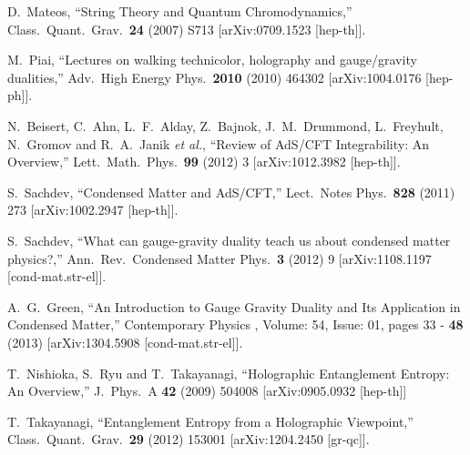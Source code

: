 \documentclass[12pt,notitlepage,a4paper]{article}
\begin{document}
\begin{thebibliography}{99.}
 


  D.~Mateos,
  ``String Theory and Quantum Chromodynamics,''
  Class.\ Quant.\ Grav.\  {\bf 24} (2007) S713
  [arXiv:0709.1523 [hep-th]].

 
 
 
 
  M.~Piai,
  ``Lectures on walking technicolor, holography and gauge/gravity dualities,''
  Adv.\ High Energy Phys.\  {\bf 2010} (2010) 464302
  [arXiv:1004.0176 [hep-ph]].

 
 
  N.~Beisert, C.~Ahn, L.~F.~Alday, Z.~Bajnok, J.~M.~Drummond, L.~Freyhult, N.~Gromov and R.~A.~Janik {\it et al.},
  ``Review of AdS/CFT Integrability: An Overview,''
  Lett.\ Math.\ Phys.\  {\bf 99} (2012) 3
  [arXiv:1012.3982 [hep-th]].
 
 
 
 
  S.~Sachdev,
 ``Condensed Matter and AdS/CFT,''
  Lect.\ Notes Phys.\  {\bf 828} (2011) 273
  [arXiv:1002.2947 [hep-th]].


  S.~Sachdev,
  ``What can gauge-gravity duality teach us about condensed matter physics?,''
  Ann.\ Rev.\ Condensed Matter Phys.\  {\bf 3} (2012) 9
  [arXiv:1108.1197 [cond-mat.str-el]].
 
  A.~G.~Green,
  ``An Introduction to Gauge Gravity Duality and Its Application in Condensed Matter,''
  Contemporary Physics , Volume: 54, Issue: 01, pages 33 - {\bf 48} (2013)
  [arXiv:1304.5908 [cond-mat.str-el]].
 
 
 
  T.~Nishioka, S.~Ryu and T.~Takayanagi,
  ``Holographic Entanglement Entropy: An Overview,''
  J.\ Phys.\ A {\bf 42} (2009) 504008
  [arXiv:0905.0932 [hep-th]]
 
 
  T.~Takayanagi,
  ``Entanglement Entropy from a Holographic Viewpoint,''
  Class.\ Quant.\ Grav.\  {\bf 29} (2012) 153001
  [arXiv:1204.2450 [gr-qc]].
  

\end{thebibliography}
\end{document}
